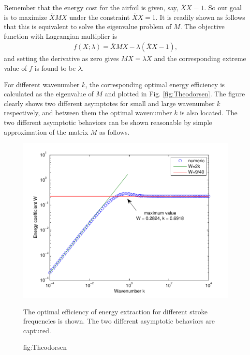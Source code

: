 Remember that the energy cost for the airfoil is given, say, $\overline{X} X = 1$.
So our goal is to maximize $\overline{X} M X$ under the constraint $\overline{X} X = 1$.
It is readily shown as follows that this is equivalent to solve the eigenvalue problem of $M$.
The objective function with Lagrangian multiplier is 
\begin{align}
f(X; \lambda) = \overline{X} M X - \lambda (\overline{X} X - 1),
\end{align}
and setting the derivative as zero gives $MX = \lambda X$ and the corresponding extreme value of $f$ is found to be $\lambda$.

For different wavenumber $k$, the corresponding optimal energy efficiency is calculated as the eigenvalue of $M$ and plotted in Fig. \ref{fig:Theodorsen}.
The figure clearly shows two different asymptotes for small and large wavenumber $k$ respectively, and between them the optimal wavenumber $k$ is also located.
The two different asymptotic behaviors can be shown reasonable by simple approximation of the matrix $M$ as follows. 

\begin{figure}
\begin{center}
\includegraphics[width=12cm]{Figures/TheodorsenEnergy.pdf}
\caption[The optimal energy efficient for different stroke frequencies]{The optimal efficiency of energy extraction for different stroke frequencies is shown. The two different asymptotic behaviors are captured.}
\end{center}
\caption{fig:Theodorsen}
\end{figure}



